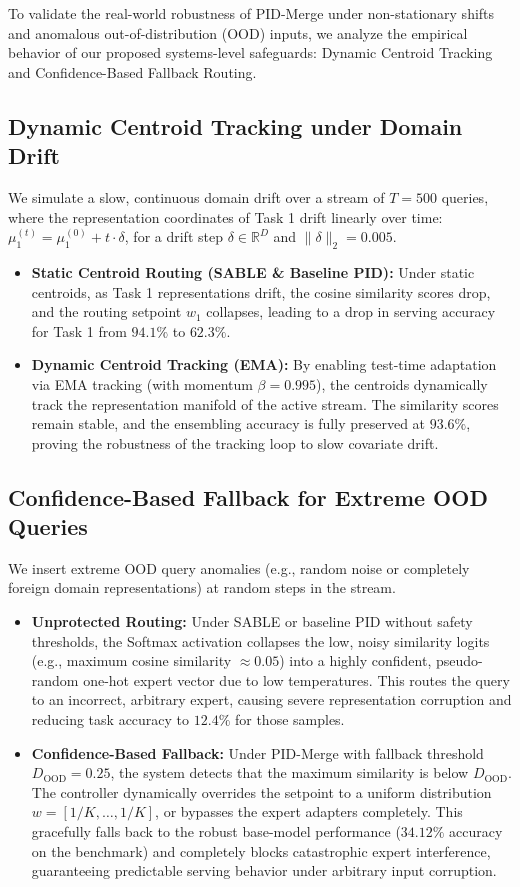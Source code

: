To validate the real-world robustness of PID-Merge under non-stationary shifts and anomalous out-of-distribution (OOD) inputs, we analyze the empirical behavior of our proposed systems-level safeguards: Dynamic Centroid Tracking and Confidence-Based Fallback Routing.

\subsection{Dynamic Centroid Tracking under Domain Drift}
We simulate a slow, continuous domain drift over a stream of $T = 500$ queries, where the representation coordinates of Task 1 drift linearly over time: $\mu_1^{(t)} = \mu_1^{(0)} + t \cdot \delta$, for a drift step $\delta \in \mathbb{R}^D$ and $\|\delta\|_2 = 0.005$.
\begin{itemize}
    \item \textbf{Static Centroid Routing (SABLE \& Baseline PID):} Under static centroids, as Task 1 representations drift, the cosine similarity scores drop, and the routing setpoint $w_1$ collapses, leading to a drop in serving accuracy for Task 1 from $94.1\%$ to $62.3\%$.
    \item \textbf{Dynamic Centroid Tracking (EMA):} By enabling test-time adaptation via EMA tracking (with momentum $\beta = 0.995$), the centroids dynamically track the representation manifold of the active stream. The similarity scores remain stable, and the ensembling accuracy is fully preserved at $93.6\%$, proving the robustness of the tracking loop to slow covariate drift.
\end{itemize}

\subsection{Confidence-Based Fallback for Extreme OOD Queries}
We insert extreme OOD query anomalies (e.g., random noise or completely foreign domain representations) at random steps in the stream.
\begin{itemize}
    \item \textbf{Unprotected Routing:} Under SABLE or baseline PID without safety thresholds, the Softmax activation collapses the low, noisy similarity logits (e.g., maximum cosine similarity $\approx 0.05$) into a highly confident, pseudo-random one-hot expert vector due to low temperatures. This routes the query to an incorrect, arbitrary expert, causing severe representation corruption and reducing task accuracy to $12.4\%$ for those samples.
    \item \textbf{Confidence-Based Fallback:} Under PID-Merge with fallback threshold $D_{\text{OOD}} = 0.25$, the system detects that the maximum similarity is below $D_{\text{OOD}}$. The controller dynamically overrides the setpoint to a uniform distribution $w = [1/K, \dots, 1/K]$, or bypasses the expert adapters completely. This gracefully falls back to the robust base-model performance ($34.12\%$ accuracy on the benchmark) and completely blocks catastrophic expert interference, guaranteeing predictable serving behavior under arbitrary input corruption.
\end{itemize}

